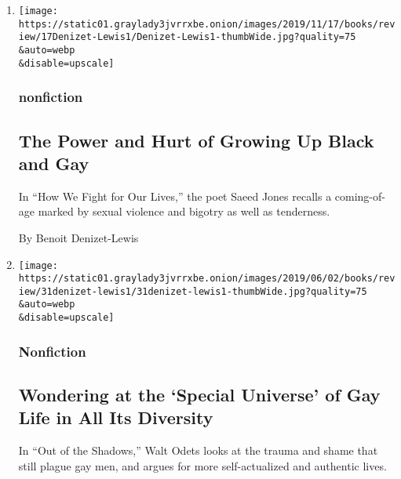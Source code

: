 \begin{enumerate}
\def\labelenumi{\arabic{enumi}.}
\item
  \href{/2019/10/08/books/review/how-we-fight-for-our-lives-saeed-jones.html}{}

  \texttt{[image: https://static01.graylady3jvrrxbe.onion/images/2019/11/17/books/review/17Denizet-Lewis1/Denizet-Lewis1-thumbWide.jpg?quality=75\\\&auto=webp\\\&disable=upscale]}

  \hypertarget{nonfiction}{%
  \subsubsection{nonfiction}\label{nonfiction}}

  \hypertarget{the-power-and-hurt-of-growing-up-black-and-gay}{%
  \subsection{The Power and Hurt of Growing Up Black and
  Gay}\label{the-power-and-hurt-of-growing-up-black-and-gay}}

  In ``How We Fight for Our Lives,'' the poet Saeed Jones recalls a
  coming-of-age marked by sexual violence and bigotry as well as
  tenderness.

  By Benoit Denizet-Lewis
\item
  \href{/2019/05/31/books/review/out-of-the-shadows-walt-odets.html}{}

  \texttt{[image: https://static01.graylady3jvrrxbe.onion/images/2019/06/02/books/review/31denizet-lewis1/31denizet-lewis1-thumbWide.jpg?quality=75\\\&auto=webp\\\&disable=upscale]}

  \hypertarget{nonfiction-1}{%
  \subsubsection{Nonfiction}\label{nonfiction-1}}

  \hypertarget{wondering-at-the-special-universe-of-gay-life-in-all-its-diversity}{%
  \subsection{Wondering at the `Special Universe' of Gay Life in All Its
  Diversity}\label{wondering-at-the-special-universe-of-gay-life-in-all-its-diversity}}

  In ``Out of the Shadows,'' Walt Odets looks at the trauma and shame
  that still plague gay men, and argues for more self-actualized and
  authentic lives.


\end{enumerate}
